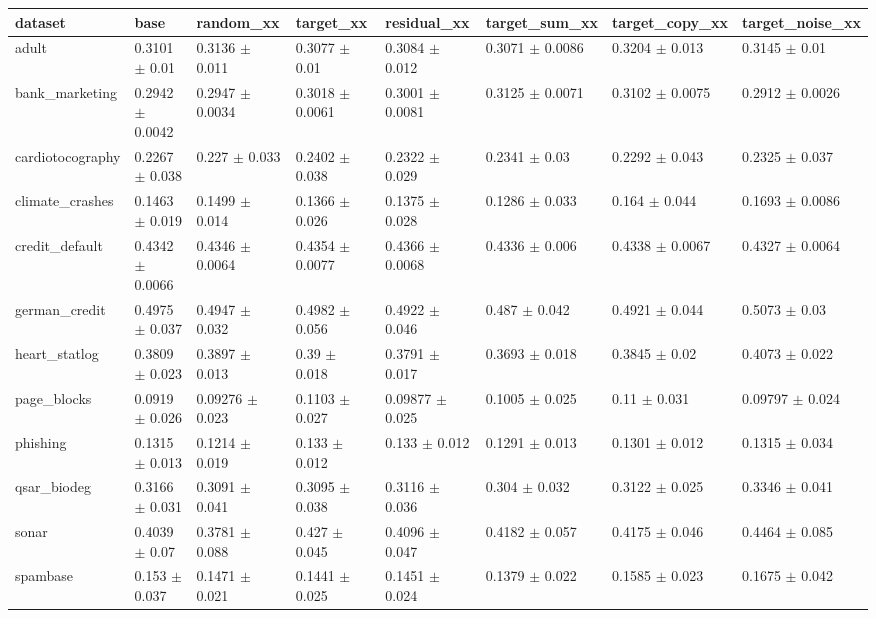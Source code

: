 \begin{tabular}{llllllll}
\toprule
dataset & base & random\_xx & target\_xx & residual\_xx & target\_sum\_xx & target\_copy\_xx & target\_noise\_xx \\
\midrule
adult & 0.3101 $\pm$ 0.01 & 0.3136 $\pm$ 0.011 & 0.3077 $\pm$ 0.01 & 0.3084 $\pm$ 0.012 & 0.3071 $\pm$ 0.0086 & 0.3204 $\pm$ 0.013 & 0.3145 $\pm$ 0.01 \\
bank\_marketing & 0.2942 $\pm$ 0.0042 & 0.2947 $\pm$ 0.0034 & 0.3018 $\pm$ 0.0061 & 0.3001 $\pm$ 0.0081 & 0.3125 $\pm$ 0.0071 & 0.3102 $\pm$ 0.0075 & 0.2912 $\pm$ 0.0026 \\
cardiotocography & 0.2267 $\pm$ 0.038 & 0.227 $\pm$ 0.033 & 0.2402 $\pm$ 0.038 & 0.2322 $\pm$ 0.029 & 0.2341 $\pm$ 0.03 & 0.2292 $\pm$ 0.043 & 0.2325 $\pm$ 0.037 \\
climate\_crashes & 0.1463 $\pm$ 0.019 & 0.1499 $\pm$ 0.014 & 0.1366 $\pm$ 0.026 & 0.1375 $\pm$ 0.028 & 0.1286 $\pm$ 0.033 & 0.164 $\pm$ 0.044 & 0.1693 $\pm$ 0.0086 \\
credit\_default & 0.4342 $\pm$ 0.0066 & 0.4346 $\pm$ 0.0064 & 0.4354 $\pm$ 0.0077 & 0.4366 $\pm$ 0.0068 & 0.4336 $\pm$ 0.006 & 0.4338 $\pm$ 0.0067 & 0.4327 $\pm$ 0.0064 \\
german\_credit & 0.4975 $\pm$ 0.037 & 0.4947 $\pm$ 0.032 & 0.4982 $\pm$ 0.056 & 0.4922 $\pm$ 0.046 & 0.487 $\pm$ 0.042 & 0.4921 $\pm$ 0.044 & 0.5073 $\pm$ 0.03 \\
heart\_statlog & 0.3809 $\pm$ 0.023 & 0.3897 $\pm$ 0.013 & 0.39 $\pm$ 0.018 & 0.3791 $\pm$ 0.017 & 0.3693 $\pm$ 0.018 & 0.3845 $\pm$ 0.02 & 0.4073 $\pm$ 0.022 \\
page\_blocks & 0.0919 $\pm$ 0.026 & 0.09276 $\pm$ 0.023 & 0.1103 $\pm$ 0.027 & 0.09877 $\pm$ 0.025 & 0.1005 $\pm$ 0.025 & 0.11 $\pm$ 0.031 & 0.09797 $\pm$ 0.024 \\
phishing & 0.1315 $\pm$ 0.013 & 0.1214 $\pm$ 0.019 & 0.133 $\pm$ 0.012 & 0.133 $\pm$ 0.012 & 0.1291 $\pm$ 0.013 & 0.1301 $\pm$ 0.012 & 0.1315 $\pm$ 0.034 \\
qsar\_biodeg & 0.3166 $\pm$ 0.031 & 0.3091 $\pm$ 0.041 & 0.3095 $\pm$ 0.038 & 0.3116 $\pm$ 0.036 & 0.304 $\pm$ 0.032 & 0.3122 $\pm$ 0.025 & 0.3346 $\pm$ 0.041 \\
sonar & 0.4039 $\pm$ 0.07 & 0.3781 $\pm$ 0.088 & 0.427 $\pm$ 0.045 & 0.4096 $\pm$ 0.047 & 0.4182 $\pm$ 0.057 & 0.4175 $\pm$ 0.046 & 0.4464 $\pm$ 0.085 \\
spambase & 0.153 $\pm$ 0.037 & 0.1471 $\pm$ 0.021 & 0.1441 $\pm$ 0.025 & 0.1451 $\pm$ 0.024 & 0.1379 $\pm$ 0.022 & 0.1585 $\pm$ 0.023 & 0.1675 $\pm$ 0.042 \\

\end{tabular}
